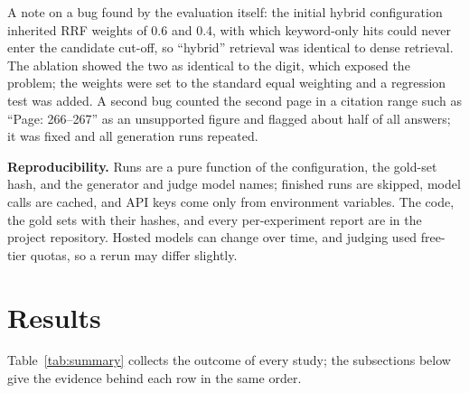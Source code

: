 \documentclass[11pt,a4paper]{article}
\begin{document}
A note on a bug found by the evaluation itself: the initial hybrid configuration inherited RRF weights of 0.6 and 0.4, with which keyword-only hits could never enter the candidate cut-off, so ``hybrid'' retrieval was identical to dense retrieval. The ablation showed the two as identical to the digit, which exposed the problem; the weights were set to the standard equal weighting and a regression test was added. A second bug counted the second page in a citation range such as ``Page: 266--267'' as an unsupported figure and flagged about half of all answers; it was fixed and all generation runs repeated.\par\medskip\noindent\textbf{Reproducibility.} Runs are a pure function of the configuration, the gold-set hash, and the generator and judge model names; finished runs are skipped, model calls are cached, and API keys come only from environment variables. The code, the gold sets with their hashes, and every per-experiment report are in the project repository. Hosted models can change over time, and judging used free-tier quotas, so a rerun may differ slightly.

\section{Results}
Table~\ref{tab:summary} collects the outcome of every study; the subsections below give the evidence behind each row in the same order.
\end{document}
